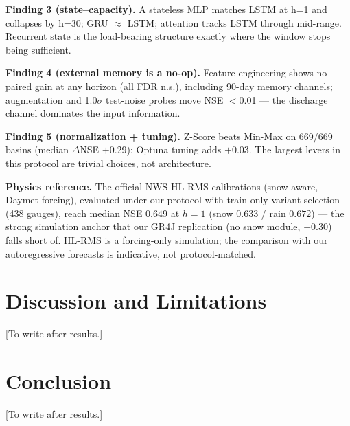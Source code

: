 \documentclass[11pt]{article}
\begin{document}
\textbf{Finding 3 (state--capacity).} A stateless MLP matches LSTM at h=1 and
collapses by h=30; GRU $\approx$ LSTM; attention tracks LSTM through
mid-range. Recurrent state is the load-bearing structure exactly where the
window stops being sufficient.

\textbf{Finding 4 (external memory is a no-op).} Feature engineering shows no
paired gain at any horizon (all FDR n.s.), including 90-day memory channels;
augmentation and 1.0$\sigma$ test-noise probes move NSE $<$0.01 --- the
discharge channel dominates the input information.

\textbf{Finding 5 (normalization + tuning).} Z-Score beats Min-Max on
669/669 basins (median $\Delta$NSE $+$0.29); Optuna tuning adds $+$0.03.
The largest levers in this protocol are trivial choices, not architecture.

\textbf{Physics reference.} The official NWS HL-RMS calibrations (snow-aware,
Daymet forcing), evaluated under our protocol with train-only variant
selection (438 gauges), reach median NSE $0.649$ at $h{=}1$ (snow
$0.633$ / rain $0.672$) --- the strong simulation anchor that our
GR4J replication (no snow module, $-0.30$) falls short of. HL-RMS is a
forcing-only simulation; the comparison with our autoregressive forecasts is
indicative, not protocol-matched.

\section{Discussion and Limitations}
[To write after results.]

\section{Conclusion}
[To write after results.]
\end{document}
